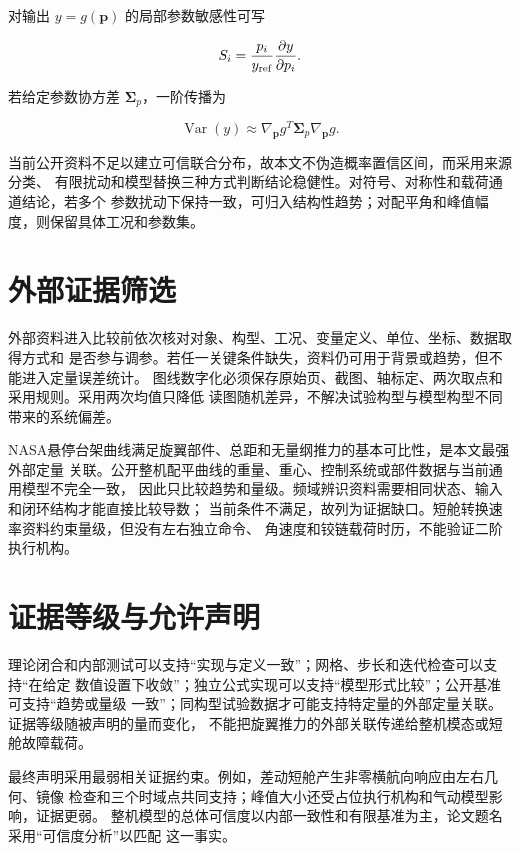 \documentclass[UTF8,12pt,oneside,openany,fontset=windows]{ctexbook}
\begin{document}
对输出 \(y=g(\mathbf p)\) 的局部参数敏感性可写

\begin{equation}
S_i=\frac{p_i}{y_{\rm ref}}\frac{\partial y}{\partial p_i}.
\end{equation}

若给定参数协方差 \(\boldsymbol\Sigma_p\)，一阶传播为

\begin{equation}
\operatorname{Var}(y)\approx
\nabla_{\mathbf p}g^T\boldsymbol\Sigma_p\nabla_{\mathbf p}g.
\end{equation}

当前公开资料不足以建立可信联合分布，故本文不伪造概率置信区间，而采用来源分类、 有限扰动和模型替换三种方式判断结论稳健性。对符号、对称性和载荷通道结论，若多个 参数扰动下保持一致，可归入结构性趋势；对配平角和峰值幅度，则保留具体工况和参数集。

\section{外部证据筛选}

外部资料进入比较前依次核对对象、构型、工况、变量定义、单位、坐标、数据取得方式和 是否参与调参。若任一关键条件缺失，资料仍可用于背景或趋势，但不能进入定量误差统计。 图线数字化必须保存原始页、截图、轴标定、两次取点和采用规则。采用两次均值只降低 读图随机差异，不解决试验构型与模型构型不同带来的系统偏差。

NASA悬停台架曲线满足旋翼部件、总距和无量纲推力的基本可比性，是本文最强外部定量 关联。公开整机配平曲线的重量、重心、控制系统或部件数据与当前通用模型不完全一致， 因此只比较趋势和量级。频域辨识资料需要相同状态、输入和闭环结构才能直接比较导数； 当前条件不满足，故列为证据缺口。短舱转换速率资料约束量级，但没有左右独立命令、 角速度和铰链载荷时历，不能验证二阶执行机构。

\section{证据等级与允许声明}

理论闭合和内部测试可以支持“实现与定义一致”；网格、步长和迭代检查可以支持“在给定 数值设置下收敛”；独立公式实现可以支持“模型形式比较”；公开基准可支持“趋势或量级 一致”；同构型试验数据才可能支持特定量的外部定量关联。证据等级随被声明的量而变化， 不能把旋翼推力的外部关联传递给整机模态或短舱故障载荷。

最终声明采用最弱相关证据约束。例如，差动短舱产生非零横航向响应由左右几何、镜像 检查和三个时域点共同支持；峰值大小还受占位执行机构和气动模型影响，证据更弱。 整机模型的总体可信度以内部一致性和有限基准为主，论文题名采用“可信度分析”以匹配 这一事实。
\end{document}

